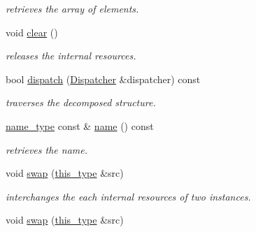 \begin{DoxyCompactItemize}
\begin{DoxyCompactList}\small\item\em retrieves the array of elements. \end{DoxyCompactList}\item 
\hypertarget{classhryky_1_1reduction_1_1_array_a08a8e794d23b1f3b6a7212f6d86bf1f0}{void \hyperlink{classhryky_1_1reduction_1_1_array_a08a8e794d23b1f3b6a7212f6d86bf1f0}{clear} ()}\label{classhryky_1_1reduction_1_1_array_a08a8e794d23b1f3b6a7212f6d86bf1f0}

\begin{DoxyCompactList}\small\item\em releases the internal resources. \end{DoxyCompactList}\item 
bool \hyperlink{classhryky_1_1reduction_1_1_base_a71b31d4d0ed915254e2cb1ef217f28c4}{dispatch} (\hyperlink{classhryky_1_1reduction_1_1_dispatcher}{Dispatcher} \&dispatcher) const 
\begin{DoxyCompactList}\small\item\em traverses the decomposed structure. \end{DoxyCompactList}\item 
\hypertarget{classhryky_1_1reduction_1_1_base_a842569265d741905eb8a353d3935f1d1}{\hyperlink{namespacehryky_1_1reduction_ac686c30a4c8d196bbd0f05629a6b921f}{name\-\_\-type} const \& \hyperlink{classhryky_1_1reduction_1_1_base_a842569265d741905eb8a353d3935f1d1}{name} () const }\label{classhryky_1_1reduction_1_1_base_a842569265d741905eb8a353d3935f1d1}

\begin{DoxyCompactList}\small\item\em retrieves the name. \end{DoxyCompactList}\item 
\hypertarget{classhryky_1_1reduction_1_1_base_ab2b137d16fbe40d839ee136bd5304cab}{void \hyperlink{classhryky_1_1reduction_1_1_base_ab2b137d16fbe40d839ee136bd5304cab}{swap} (\hyperlink{classhryky_1_1reduction_1_1_array_a7d7a0bf446afa38277eab993671ccc83}{this\-\_\-type} \&src)}\label{classhryky_1_1reduction_1_1_base_ab2b137d16fbe40d839ee136bd5304cab}

\begin{DoxyCompactList}\small\item\em interchanges the each internal resources of two instances. \end{DoxyCompactList}\item 
\hypertarget{classhryky_1_1reduction_1_1_array_a05d6ce4a51b1d89f975e0329076a7533}{void \hyperlink{classhryky_1_1reduction_1_1_array_a05d6ce4a51b1d89f975e0329076a7533}{swap} (\hyperlink{classhryky_1_1reduction_1_1_array_a7d7a0bf446afa38277eab993671ccc83}{this\-\_\-type} \&src)}\label{classhryky_1_1reduction_1_1_array_a05d6ce4a51b1d89f975e0329076a7533}


\end{DoxyCompactItemize}
